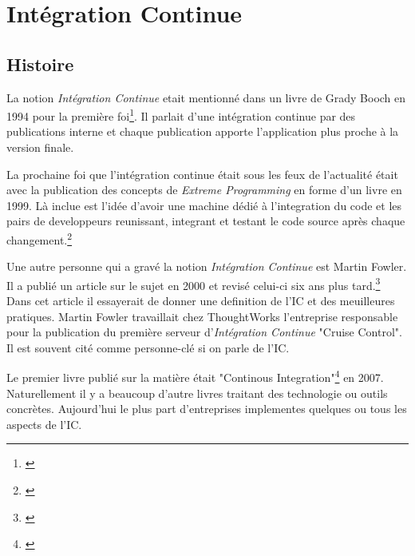 \chapter{Intégration Continue}
\label{chap:integrationcontinue}

\section{Histoire}
La notion \textit{Intégration Continue} etait mentionné dans un livre de Grady Booch en 1994 pour la première foi\footnote{\cite{boochooad}}. Il parlait d'une intégration continue par des publications interne et chaque publication apporte l'application plus proche à la version finale.

La prochaine foi que l'intégration continue était sous les feux de l'actualité était avec la publication des concepts de \textit{Extreme Programming} en forme d'un livre en 1999.
Là inclue est l'idée d'avoir une machine dédié à l'integration du code et les pairs de developpeurs reunissant, integrant et testant le code source après chaque changement.\footnote{\cite{robertshistory}}

Une autre personne qui a gravé la notion \textit{Intégration Continue} est Martin Fowler. Il a publié un article sur le sujet en 2000 et revisé celui-ci six ans plus tard.\footnote{\cite{fowlerci}} Dans cet article il essayerait de donner une definition de l'IC et des meuilleures pratiques. Martin Fowler travaillait chez ThoughtWorks l'entreprise responsable pour la publication du première serveur d'\textit{Intégration Continue} "Cruise Control". Il est souvent cité comme personne-clé si on parle de l'IC.

Le premier livre publié sur la matière était "Continous Integration"\footnote{\cite{duvallconint}} en 2007. Naturellement il y a beaucoup d'autre livres traitant des technologie ou outils concrètes. Aujourd'hui le plus part d'entreprises implementes quelques ou tous les aspects de l'IC.

\nocite{wikici}
\newpage


